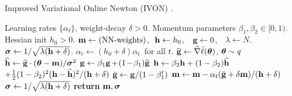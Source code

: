 \renewcommand\algorithmiccomment[1]{\hfill{\textcolor{commentcolor}{\eqparbox{COMMENT}{#1}}}}
\begin{algorithm}[!h]
   \caption{Improved Variational Online Newton (IVON) \citep{IVON}.}
	\label{alg:ivon}
   \begin{algorithmic}[1]
      \REQUIRE Learning rates $\{ \alpha_t \}$, weight-decay $\delta >
      0$.
      \REQUIRE Momentum parameters $\beta_1, \beta_2 \in [0, 1)$.
      \REQUIRE Hessian init $h_0 > 0$.
      \renewcommand{\algorithmicrequire}{\textbf{Init:}}
		\REQUIRE $\mbox{$\mbox{$\mathbf{m}$}$} \leftarrow \text{(NN-weights)}$,\,\, $\mbox{$\mbox{$\mathbf{h}$}$} \leftarrow h_0 $,
                      \,\, $\mbox{$\mbox{$\mathbf{g}$}$} \leftarrow 0$, \,\, $\lambda \leftarrow N$.
      \REQUIRE $\mbox{$\mbox{$\boldsymbol{\sigma}$}$}
                      \leftarrow 1 / \sqrt{\lambda (\mbox{$\mbox{$\mathbf{h}$}$} +
                        \delta)}$.
      \renewcommand{\algorithmicrequire}{\textbf{Optional:}}
      \REQUIRE $\alpha_t \leftarrow (h_0 +
                      \delta) \alpha_t$\,  for all $t$.
                      \STATE \hspace{-0.15cm}$\widehat {\mbox{$\mbox{$\mathbf{g}$}$}} \leftarrow
                      {\widehat \nabla} \bar{\ell}(\boldsymbol{\theta})$,
      \text{\textcolor{black}{ where} } 
      $\boldsymbol{\theta} \sim q$
      \STATE \hspace{-0.15cm}$\widehat {\mbox{$\mbox{$\mathbf{h}$}$}} \leftarrow {\widehat {\mbox{$\mbox{$\mathbf{g}$}$}}\cdot (\boldsymbol{\theta}-\mbox{$\mbox{$\mathbf{m}$}$}) / \mbox{$\mbox{$\boldsymbol{\sigma}$}$}^2}$
		\STATE \hspace{-0.15cm}$\vg \leftarrow \beta_1 \vg\hspace{-0.03cm}+\hspace{-0.05cm}(1\hspace{-0.05cm}-\hspace{-0.05cm}\beta_1) \widehat \vg$ 
                \STATE \hspace{-0.15cm}$\mbox{$\mbox{$\mathbf{h}$}$} \leftarrow \beta_2 \mbox{$\mbox{$\mathbf{h}$}$}+(1
                - \beta_2)\widehat {\mbox{$\mbox{$\mathbf{h}$}$}}$${+\mbox{$\frac{1}{2}$} (1 - \beta_2)^2
                  (\mbox{$\mbox{$\mathbf{h}$}$} - \widehat {\mbox{$\mbox{$\mathbf{h}$}$}})^2 / (\mbox{$\mbox{$\mathbf{h}$}$} + \delta)}$
      \STATE \hspace{-0.15cm}$\bar {\mbox{$\mbox{$\mathbf{g}$}$}} \leftarrow \mbox{$\mbox{$\mathbf{g}$}$} / (1 - \beta_1^{t})$ 
      \STATE \hspace{-0.15cm}$\mbox{$\mbox{$\mathbf{m}$}$} \leftarrow \mbox{$\mbox{$\mathbf{m}$}$} - \alpha_t(\bar {\mbox{$\mbox{$\mathbf{g}$}$}} + \delta \mbox{$\mbox{$\mathbf{m}$}$}) / ({\mbox{$\mbox{$\mathbf{h}$}$}} + \delta)$
		\STATE \hspace{-0.15cm}$\mbox{$\mbox{$\boldsymbol{\sigma}$}$} \leftarrow 1 / \sqrt{\lambda (\mbox{$\mbox{$\mathbf{h}$}$} + \delta)}$
      \ENDFOR
		\STATE \textbf{return} $\mbox{$\mbox{$\mathbf{m}$}$}, \mbox{$\mbox{$\boldsymbol{\sigma}$}$}$ 
	\end{algorithmic}
\end{algorithm}
 
